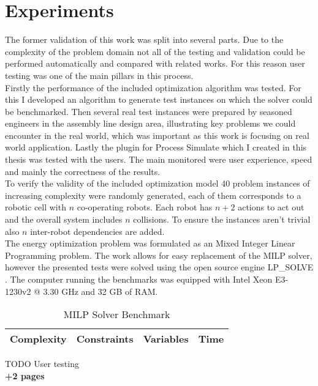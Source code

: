 \chapter{Experiments}
\label{ch:experiments}
\graphicspath{{chapters/Experiments/}}

The former validation of this work was split into several parts. Due to the complexity of the problem domain not all of the testing and validation could be performed automatically and compared with related works. For this reason user testing was one of the main pillars in this process. \\

Firstly the performance of the included optimization algorithm was tested. For this I developed an algorithm to generate test instances on which the solver could be benchmarked. Then several real test instances were prepared by seasoned engineers in the assembly line design area, illustrating key problems we could encounter in the real world, which was important as this work is focusing on real world application. Lastly the plugin for Process Simulate which I created in this thesis was tested with the users. The main monitored were user experience, speed and mainly the correctness of the results. \\

To verify the validity of the included optimization model 40 problem instances of increasing complexity were randomly generated, each of them corresponds to a robotic cell with $n$ co-operating robots. Each robot has $n + 2$ actions to act out and the overall system includes $n$ collisions. To ensure the instances aren't trivial also $n$ inter-robot dependencies are added. \\

The energy optimization problem was formulated as an Mixed Integer Linear Programming problem. The work allows for easy replacement of the MILP solver, however the presented tests were solved using the open source engine LP\_SOLVE \cite{LPSolve}. The computer running the benchmarks was equipped with Intel Xeon E3-1230v2 @ 3.30 GHz \cite{BeastCPUIntelARK} and 32 GB of RAM. \\

\begin{table}[ht]
    \label{tbl:milpspeed}
    \centering
    \begin{tabular}{|c|c|c|c|}
        \hline
        Complexity & Constraints & Variables & Time \\
        \hline
        
        \hline
    \end{tabular}
    \caption{MILP Solver Benchmark}
\end{table}

TODO User testing \\

\textbf{+2 pages}